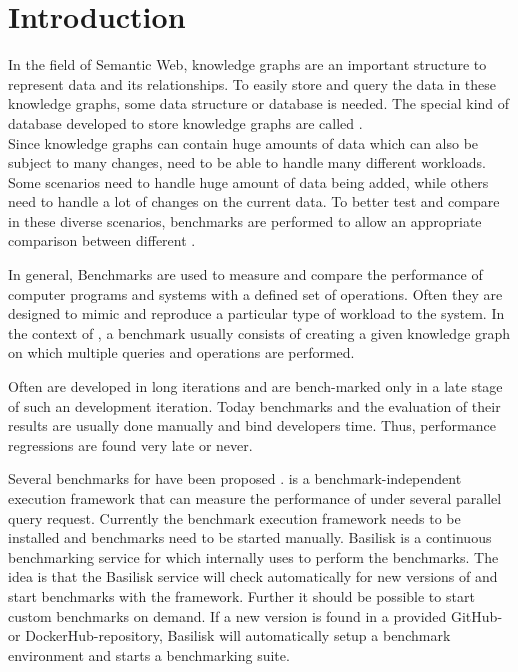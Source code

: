 \chapter{Introduction}
\label{ch:introduction}



In the field of Semantic Web, knowledge graphs are an important structure to represent data and its relationships.
To easily store and query the data in these knowledge graphs, some data structure or database is needed.
The special kind of database developed to store knowledge graphs are called \tsp{}. \\

Since knowledge graphs can contain huge amounts of data which can also be subject to many changes, \tsp{} need to be able to handle many different workloads.
Some scenarios need to handle huge amount of data being added, while others need to handle a lot of changes on the current data.
To better test and compare \tsp{} in these diverse scenarios, benchmarks are performed to allow an appropriate comparison between different \tsp{}\cite{saleemHowRepresentativeSPARQL2019}.

In general, Benchmarks are used to measure and compare the performance of computer programs and systems with a defined set of operations.
Often they are designed to mimic and reproduce a particular type of workload to the system.
In the context of \tsp{}, a benchmark usually consists of creating a given knowledge graph on which multiple queries and operations are performed.

Often \tsp{} are developed in long iterations and are bench-marked only in a late stage of such an development iteration.
Today benchmarks and the evaluation of their results are usually done manually and bind developers time.
Thus, performance regressions are  found very late or never.


Several benchmarks for \tsp{} have been proposed \cite{saleemHowRepresentativeSPARQL2019}.
\iguana{} is a benchmark-independent execution framework \cite{conradsIguanaGenericFramework2017} that can measure the performance of \tsp{} under several parallel query request.
Currently the benchmark execution framework needs to be installed and benchmarks need to be started manually.
Basilisk is a continuous benchmarking service for \tsp{} which internally uses \iguana{} to perform the benchmarks.
The idea is that the Basilisk service will check automatically for new versions of \tsp{} and start benchmarks with the \iguana{} framework.
Further it should be possible to start custom benchmarks on demand.
If a new version is found in a provided GitHub- or DockerHub-repository, Basilisk will automatically setup a benchmark environment and starts a benchmarking suite.

